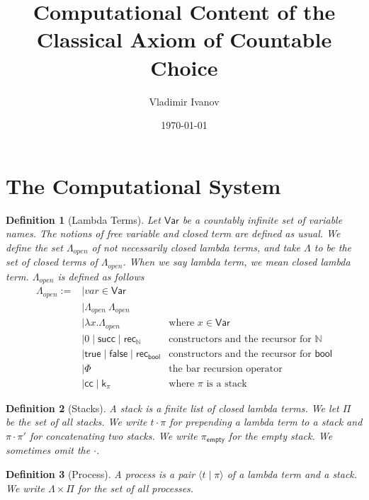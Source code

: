 \documentclass{article}
\title{Computational Content of the Classical Axiom of Countable Choice}
\author{Vladimir Ivanov}
\date{\today}
\newcommand{\successor}{\mathsf{succ}}
\newcommand{\N}{\mathbb{N}}
\newcommand{\recN}{\mathsf{rec}_{\mathbb{N}}}
\newcommand{\bool}{\mathsf{bool}}
\newcommand{\true}{\mathsf{true}}
\newcommand{\false}{\mathsf{false}}
\newcommand{\recbool}{\mathsf{rec_{bool}}}
\newcommand{\proc}[2]{\langle{#1}\mid{#2}\rangle}
\newcommand{\emptystack}{\pi_\mathsf{empty}}
\newcommand{\cc}{\mathsf{cc}}
\newcommand{\cont}{\mathsf{k}}
\newtheorem{definition}{Definition}
\begin{document}
    
\maketitle

\section{The Computational System}

\begin{definition}[Lambda Terms]
    Let $\mathsf{Var}$ be a countably infinite set of variable names.
    The notions of free variable and closed term are defined as usual.
    We define the set $\Lambda_{open}$ of not necessarily closed lambda terms, and take $\Lambda$ to be the set of closed terms of $\Lambda_{open}$. When we say lambda term, we mean closed lambda term. $\Lambda_{open}$ is defined as follows
    \begin{align*}
        \Lambda_{open} := & \mid var \in \mathsf{Var} \\
        & \mid \Lambda_{open}\ \Lambda_{open} \\
        & \mid \lambda x. \Lambda_{open} & \text{where $x \in \mathsf{Var}$} \\
        & \mid 0 \mid \successor \mid \recN & \text{constructors and the recursor for $\N$}\\
        & \mid \true \mid \false \mid \recbool & \text{constructors and the recursor for $\bool$}\\
        & \mid \Phi & \text{the bar recursion operator} \\
        & \mid \cc \mid \cont_\pi & \text{where $\pi$ is a stack}
    \end{align*}
\end{definition}

\begin{definition}[Stacks]
    A stack is a finite list of closed lambda terms.
    We let $\Pi$ be the set of all stacks.
    We write $t \cdot \pi$ for prepending a lambda term to a stack and $\pi \cdot \pi'$ for concatenating two stacks. We write $\emptystack$ for the empty stack.
    We sometimes omit the $\cdot$. 
\end{definition}

\begin{definition}[Process]
    A process is a pair $\proc{t}{\pi}$ of a lambda term and a stack.
    We write $\Lambda \times \Pi$ for the set of all processes.
\end{definition}
\end{document}
